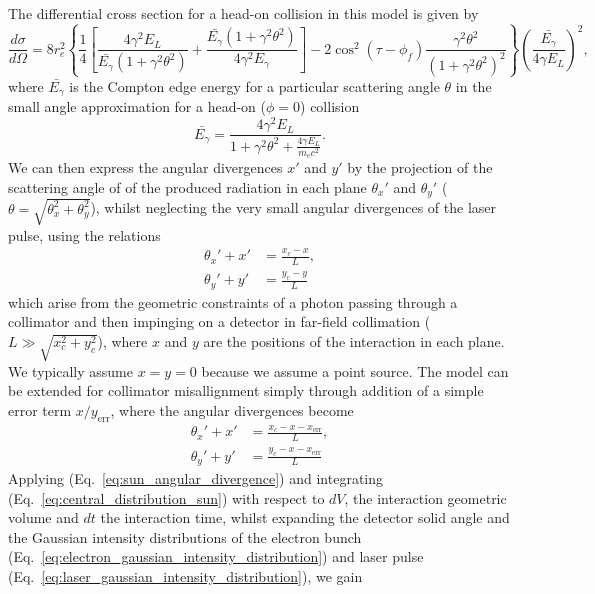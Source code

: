 \documentclass[../main.tex]{subfiles}
\begin{document}
The differential cross section for a head-on collision in this model is given by
\begin{equation}
\frac{d\sigma}{d\Omega} = 8r_{e}^{2}\left\{\frac{1}{4}\left[\frac{4\gamma^{2}E_{L}}{\bar{E_{\gamma}}\left(1+\gamma^{2}\theta^{2}\right)}+\frac{\bar{E_{\gamma}}\left(1+\gamma^{2}\theta^{2}\right)}{4\gamma^{2}E_{\gamma}}\right]-2\cos^{2}\left(\tau-\phi_{f}\right)\frac{\gamma^{2}\theta^{2}}{\left(1+\gamma^{2}\theta^{2}\right)^{2}}\right\}\left(\frac{\bar{E_{\gamma}}}{4\gamma E_{L}}\right)^{2},
\label{eq:sun_differential_cross_section}    
\end{equation}
where $\bar{E_{\gamma}}$ is the Compton edge energy for a particular scattering angle $\theta$ in the small angle approximation for a head-on ($\phi=0$) collision
\begin{equation}
\bar{E_{\gamma}} = \frac{4\gamma^{2}E_{L}}{1+\gamma^{2}\theta^{2}+\frac{4\gamma E_{L}}{m_{e}c^{2}}}.
\label{eq:sun_Egamma_bar}    
\end{equation}
We can then express the angular divergences $x'$ and $y'$ by the projection of the scattering angle of of the produced radiation in each plane $\theta_{x}'$ and $\theta_{y}'$ ($\theta = \sqrt{\theta_{x}^{2}+\theta_{y}^{2}}$), whilst neglecting the very small angular divergences of the laser pulse, using the relations
\begin{align}
\theta_{x}' + x' &= \frac{x_{c}-x}{L}, \\
\theta_{y}' + y' &= \frac{y_{c}-y}{L}
\label{eq:sun_angular_divergence}    
\end{align}
which arise from the geometric constraints of a photon passing through a collimator and then impinging on a detector in far-field collimation ($L \gg \sqrt{x_{c}^{2}+y_{c}^{2}}$), where $x$ and $y$ are the positions of the interaction in each plane. We typically assume $x=y=0$ because we assume a point source. The model can be extended for collimator misallignment simply through addition of a simple error term \cite{sun2009characterizations} $x/y_{\mathrm{err}}$, where the angular divergences become
\begin{align}
\theta_{x}' + x' &= \frac{x_{c}-x-x_{\mathrm{err}}}{L}, \\
\theta_{y}' + y' &= \frac{y_{c}-x-x_{\mathrm{err}}}{L}
\label{eq:sun_collimator_misallignment}    
\end{align}
Applying (Eq.~\ref{eq:sun_angular_divergence}) and integrating (Eq.~\ref{eq:central_distribution_sun}) with respect to $dV$, the interaction geometric volume and $dt$ the interaction time, whilst expanding the detector solid angle and the Gaussian intensity distributions of the electron bunch (Eq.~\ref{eq:electron_gaussian_intensity_distribution}) and laser pulse (Eq.~\ref{eq:laser_gaussian_intensity_distribution}), we gain
\end{document}
